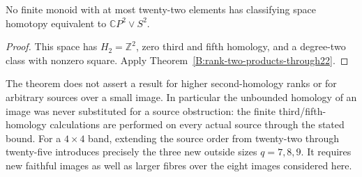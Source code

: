 \begin{corollary}\label{B:CP2-wedge-S2-lower23}
No finite monoid with at most twenty-two elements has classifying
space homotopy equivalent to $\mathbb CP^2\vee S^2$.
\end{corollary}
\begin{proof}
This space has $H_2=\mathbb Z^2$, zero third and fifth homology,
and a degree-two class with nonzero square. Apply
Theorem~\ref{B:rank-two-products-through22}.
\end{proof}

\begin{remark}\label{B:rank-two-through22-scope}
The theorem does not assert a result for higher second-homology
ranks or for arbitrary sources over a small image. In particular
the unbounded homology of an image was never substituted for a
source obstruction: the finite third/fifth-homology calculations
are performed on every actual source through the stated bound.
For a $4\times4$ band, extending the source order from twenty-two
through twenty-five introduces precisely the three new outside
sizes $q=7,8,9$. It requires new faithful images as well as larger
fibres over the eight images considered here.
\end{remark}
